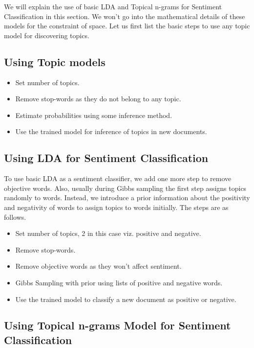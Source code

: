 \documentclass[11pt]{article}
\begin{document}
We will explain the use of basic LDA and Topical n-grams for Sentiment Classification in
this section. We won't go into the mathematical details of these models for the constraint 
of space. Let us first list the basic steps to use any topic model for discovering topics.

\subsection{Using Topic models}

\begin{itemize}
 \itemsep0em
 \item Set number of topics.
 \item Remove stop-words as they do not belong to any topic.
 \item Estimate probabilities using some inference method.
 \item Use the trained model for inference of topics in new documents.
\end{itemize}

\subsection{Using LDA for Sentiment Classification}

To use basic LDA as a sentiment classifier, we add one more step to remove objective words.
Also, usually during Gibbs sampling the first step assigns topics randomly to words. Instead, we
introduce a prior information about the positivity and negativity of words to assign topics to 
words initially. The steps are as follows.

\begin{itemize}
 \itemsep0em
 \item Set number of topics, 2 in this case viz. positive and negative.
 \item Remove stop-words.
 \item Remove objective words as they won't affect sentiment.
 \item Gibbs Sampling with prior using lists of positive and negative words.
 \item Use the trained model to classify a new document as positive or negative.
\end{itemize}

\subsection{Using Topical n-grams Model for Sentiment Classification}
\end{document}
